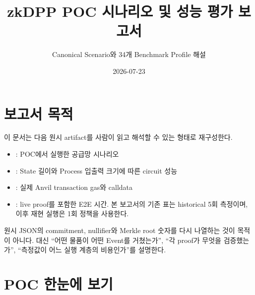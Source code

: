 \documentclass[11pt,a4paper]{extarticle}
\title{zkDPP POC 시나리오 및 성능 평가 보고서}
\author{Canonical Scenario와 34개 Benchmark Profile 해설}
\date{2026-07-23}
\begin{document}
\maketitle

\section*{보고서 목적}

이 문서는 다음 원시 artifact를 사람이 읽고 해석할 수 있는 형태로 재구성한다.

\begin{itemize}
  \item {}: POC에서 실행한 공급망 시나리오
  \item {}: State 길이와 Process 입출력 크기에 따른 circuit 성능
  \item {}: 실제 Anvil transaction gas와 calldata
  \item {}: live proof를 포함한 E2E 시간. 본 보고서의 기존
        표는 historical 5회 측정이며, 이후 재현 실행은 1회 정책을 사용한다.
\end{itemize}

원시 JSON의 commitment, nullifier와 Merkle root 숫자를 다시 나열하는 것이 목적이 아니다.
대신 ``어떤 물품이 어떤 Event를 거쳤는가'', ``각 proof가 무엇을 검증했는가'',
``측정값이 어느 실행 계층의 비용인가''를 설명한다.

\tableofcontents
\newpage

\section{POC 한눈에 보기}
\end{document}
